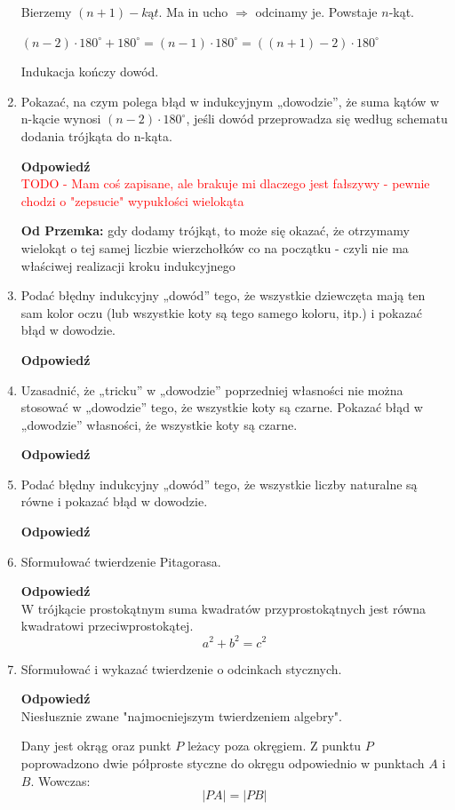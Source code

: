 \documentclass[12pt,a4paper]{article}
\newcounter{twierdzenie}
\theoremstyle{break}
\newcommand{\Odp}[1]{
		\begin{mdframed}[style=zadanie]
			\textbf{Odpowiedź}\\
			#1
		\end{mdframed}
	}
\begin{document}
\begin{enumerate}[1.]
{\begin{enumerate}[I]
			Bierzemy $(n+1)-kąt$. Ma in ucho $\Rightarrow$ odcinamy je. Powstaje $n$-kąt.
			
			$(n-2)\cdot180^\circ+180^\circ = (n-1)\cdot180^\circ = ((n+1)-2)\cdot180^\circ$
			
			Indukacja kończy dowód.
		\end{enumerate}
	}
	
	\item Pokazać, na czym polega błąd w indukcyjnym „dowodzie”, że suma kątów w n-kącie	wynosi $(n - 2) \cdot 180^\circ$, jeśli dowód przeprowadza się według schematu dodania trójkąta do n-kąta.
	\Odp{
		\textcolor{red}{TODO - Mam coś zapisane, ale brakuje mi dlaczego jest fałszywy - pewnie chodzi o "zepsucie" wypukłości wielokąta}
		
		\textbf{Od Przemka:} gdy dodamy trójkąt, to może się okazać, że otrzymamy wielokąt o tej samej liczbie wierzchołków co na początku - czyli nie ma właściwej realizacji kroku indukcyjnego
		
	}
	
	\item Podać błędny indukcyjny „dowód” tego, że wszystkie dziewczęta mają ten sam kolor oczu (lub wszystkie koty są tego samego koloru, itp.) i pokazać błąd w dowodzie.
	\Odp{
		
	}
	
	\item Uzasadnić, że „tricku” w „dowodzie” poprzedniej własności nie można stosować w „dowodzie” tego, że wszystkie koty są czarne. Pokazać błąd w „dowodzie” własności, że wszystkie koty są czarne.
	\Odp{
		
	}
	
	\item Podać błędny indukcyjny „dowód” tego, że wszystkie liczby naturalne są równe i pokazać błąd w dowodzie.
	\Odp{
		
	}
	
	\item Sformułować twierdzenie Pitagorasa.
	\Odp{
		W trójkącie prostokątnym suma kwadratów przyprostokątnych jest równa kwadratowi przeciwprostokątej.
		$$a^2+b^2=c^2$$
	}
	
	\item Sformułować i wykazać twierdzenie o odcinkach stycznych.
	\Odp{
		Niesłusznie zwane "najmocniejszym twierdzeniem algebry".
		
		Dany jest okrąg oraz punkt $P$ leżacy poza okręgiem. Z punktu $P$ poprowadzono dwie półproste styczne do okręgu odpowiednio w punktach $A$ i $B$. Wowczas:	$$|PA|=|PB|$$
		
}
\end{enumerate}
\end{document}
